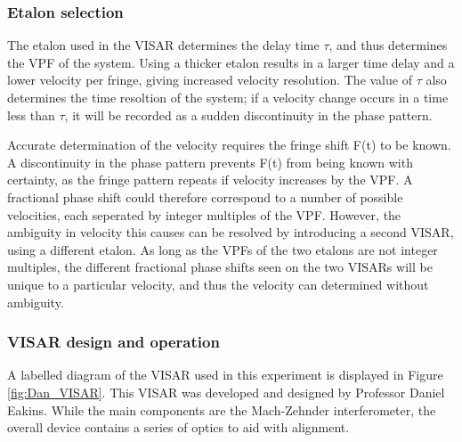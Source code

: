 \subsubsection{Etalon selection}

The etalon used in the VISAR determines the delay time $\tau$, and thus determines the VPF of the system. Using a thicker etalon results in a larger time delay and a lower velocity per fringe, giving increased velocity resolution. The value of $\tau$ also determines the time resoltion of the system; if a velocity change occurs in a time less than $\tau$, it will be recorded as a sudden discontinuity in the phase pattern.

Accurate determination of the velocity requires the fringe shift F(t) to be known. A discontinuity in the phase pattern prevents F(t) from being known with certainty, as the fringe pattern repeats if velocity increases by the VPF. A fractional phase shift could therefore correspond to a number of possible velocities, each seperated by integer multiples of the VPF. However, the ambiguity in velocity this causes can be resolved by introducing a second VISAR, using a different etalon. As long as the VPFs of the two etalons are not integer multiples, the different fractional phase shifts seen on the two VISARs will be unique to a particular velocity, and thus the velocity can determined without ambiguity.

\subsubsection{VISAR design and operation}

A labelled diagram of the VISAR used in this experiment is displayed in Figure \ref{fig:Dan_VISAR}. This VISAR was developed and designed by Professor Daniel Eakins. While the main components are the Mach-Zehnder interferometer, the overall device contains a series of optics to aid with alignment.

